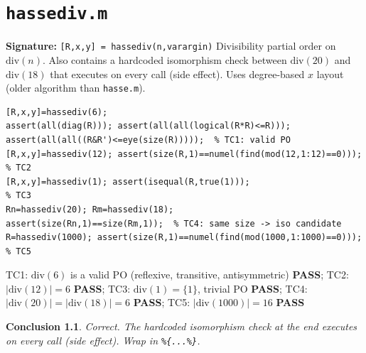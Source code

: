 \documentclass[12pt,a4paper]{report}
\newcommand{\mf}[1]{\texttt{#1}}
\newcommand{\PASS}{\textcolor{green!60!black}{\textbf{PASS}}}
\newtheorem{concl}{Conclusion}[chapter]
\begin{document}
\chapter{\mf{hassediv.m}}
\begin{tcolorbox}[Abox,title=Analysis]
\textbf{Signature:} \lstinline|[R,x,y] = hassediv(n,varargin)|\quad
Divisibility partial order on $\mathrm{div}(n)$. Also contains a hardcoded isomorphism check between $\mathrm{div}(20)$ and $\mathrm{div}(18)$ that executes on every call (side effect). Uses degree-based $x$ layout (older algorithm than \mf{hasse.m}).
\end{tcolorbox}
\begin{lstlisting}[caption={Tests for hassediv.m}]
[R,x,y]=hassediv(6);
assert(all(diag(R))); assert(all(all(logical(R*R)<=R)));
assert(all(all((R&R')<=eye(size(R)))));  % TC1: valid PO
[R,x,y]=hassediv(12); assert(size(R,1)==numel(find(mod(12,1:12)==0))); % TC2
[R,x,y]=hassediv(1); assert(isequal(R,true(1)));                       % TC3
Rn=hassediv(20); Rm=hassediv(18);
assert(size(Rn,1)==size(Rm,1));  % TC4: same size -> iso candidate
R=hassediv(1000); assert(size(R,1)==numel(find(mod(1000,1:1000)==0))); % TC5
\end{lstlisting}
\begin{tcolorbox}[Pbox,title=TC1--TC5 -- All pass]
TC1: $\mathrm{div}(6)$ is a valid PO (reflexive, transitive, antisymmetric) \PASS; TC2: $|\mathrm{div}(12)|=6$ \PASS; TC3: $\mathrm{div}(1)=\{1\}$, trivial PO \PASS; TC4: $|\mathrm{div}(20)|=|\mathrm{div}(18)|=6$ \PASS; TC5: $|\mathrm{div}(1000)|=16$ \PASS
\end{tcolorbox}
\begin{concl}
Correct. The hardcoded isomorphism check at the end executes on every call (side effect). Wrap in \lstinline|%{...%}|.
\end{concl}

\end{document}

